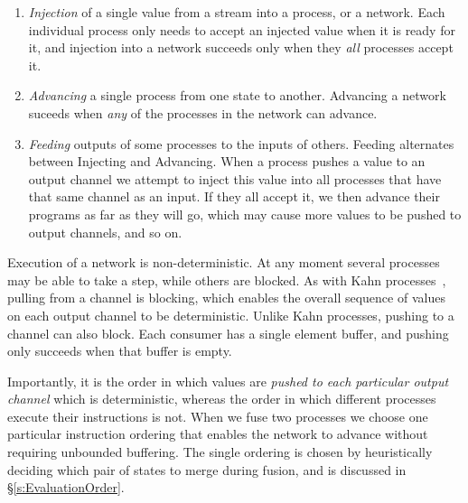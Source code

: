 \begin{enumerate}
\item \emph{Injection} of a single value from a stream into a process, or a network. Each individual process only needs to accept an injected  value when it is ready for it, and injection into a network succeeds only when they \emph{all} processes accept it.

\item \emph{Advancing} a single process from one state to another. Advancing a network suceeds when \emph{any} of the processes in the network can advance.

\item \emph{Feeding} outputs of some processes to the inputs of others. Feeding alternates between Injecting and Advancing. When a process pushes a value to an output channel we attempt to inject this value into all processes that have that same channel as an input. If they all accept it, we then advance their programs as far as they will go, which may cause more values to be pushed to output channels, and so on.
\end{enumerate}

Execution of a network is non-deterministic. At any moment several processes may be able to take a step, while others are blocked. As with Kahn processes~\cite{kahn1976coroutines}, pulling from a channel is blocking, which enables the overall sequence of values on each output channel to be deterministic. Unlike Kahn processes, pushing to a channel can also block. Each consumer has a single element buffer, and pushing only succeeds when that buffer is empty.


Importantly, it is the order in which values are \emph{pushed to each particular output channel} which is deterministic, whereas the order in which different processes execute their instructions is not. When we fuse two processes we choose one particular instruction ordering that enables the network to advance without requiring unbounded buffering. The single ordering is chosen by heuristically deciding which pair of states to merge during fusion, and is discussed in \S\ref{s:EvaluationOrder}.

